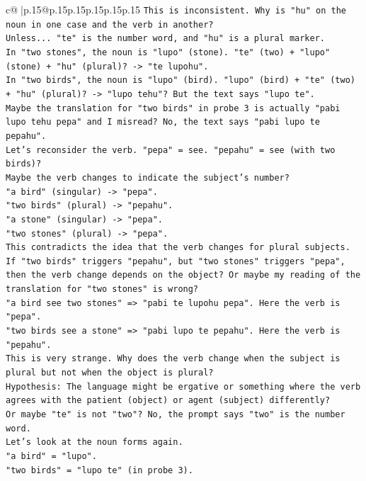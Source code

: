 \documentclass{article}
\begin{document}
{\begin{supertabular}{c@{$\;$}|p{.15\linewidth}@{}p{.15\linewidth}p{.15\linewidth}p{.15\linewidth}p{.15\linewidth}p{.15\linewidth}}
{{{\texttt{This is inconsistent. Why is "hu" on the noun in one case and the verb in another?} \\
\texttt{Unless... "te" is the number word, and "hu" is a plural marker.} \\
\texttt{In "two stones", the noun is "lupo" (stone). "te" (two) + "lupo" (stone) + "hu" (plural)? {-}> "te lupohu".} \\
\texttt{In "two birds", the noun is "lupo" (bird). "lupo" (bird) + "te" (two) + "hu" (plural)? {-}> "lupo tehu"? But the text says "lupo te".} \\
\texttt{Maybe the translation for "two birds" in probe 3 is actually "pabi lupo tehu pepa" and I misread? No, the text says "pabi lupo te pepahu".} \\
\texttt{Let's reconsider the verb. "pepa" = see. "pepahu" = see (with two birds)?} \\
\texttt{Maybe the verb changes to indicate the subject's number?} \\
\texttt{"a bird" (singular) {-}> "pepa".} \\
\texttt{"two birds" (plural) {-}> "pepahu".} \\
\texttt{"a stone" (singular) {-}> "pepa".} \\
\texttt{"two stones" (plural) {-}> "pepa".} \\
\texttt{This contradicts the idea that the verb changes for plural subjects. If "two birds" triggers "pepahu", but "two stones" triggers "pepa", then the verb change depends on the object? Or maybe my reading of the translation for "two stones" is wrong?} \\
\texttt{"a bird see two stones" => "pabi te lupohu pepa". Here the verb is "pepa".} \\
\texttt{"two birds see a stone" => "pabi lupo te pepahu". Here the verb is "pepahu".} \\
\texttt{This is very strange. Why does the verb change when the subject is plural but not when the object is plural?} \\
\texttt{Hypothesis: The language might be ergative or something where the verb agrees with the patient (object) or agent (subject) differently?} \\
\texttt{Or maybe "te" is not "two"? No, the prompt says "two" is the number word.} \\
\texttt{Let's look at the noun forms again.} \\
\texttt{"a bird" = "lupo".} \\
\texttt{"two birds" = "lupo te" (in probe 3).} \\
}}}
\end{supertabular}}
\end{document}
